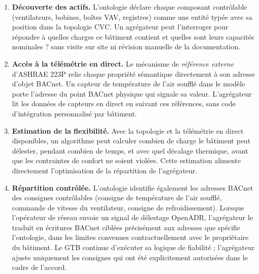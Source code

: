\begin{enumerate}[leftmargin=*, itemsep=2pt]
  \item \textbf{Découverte des actifs.} L'ontologie déclare chaque composant contrôlable (ventilateurs, bobines,
        boîtes VAV, registres) comme une entité typée avec sa position dans la topologie CVC.
        Un agrégateur peut l'interroger pour répondre à \og quelles charges ce bâtiment contient et quelles sont
        leurs capacités nominales ? \fg{} sans visite sur site ni révision manuelle de la documentation.
  \item \textbf{Accès à la télémétrie en direct.} Le mécanisme de \emph{référence externe} d'ASHRAE 223P relie
        chaque propriété sémantique directement à son adresse d'objet BACnet.
        Un capteur de température de l'air soufflé dans le modèle porte l'adresse du point BACnet physique
        qui signale sa valeur.
        L'agrégateur lit les données de capteurs en direct en suivant ces références, sans code d'intégration
        personnalisé par bâtiment.
  \item \textbf{Estimation de la flexibilité.} Avec la topologie et la télémétrie en direct disponibles, un
        algorithme peut calculer combien de charge le bâtiment peut délester, pendant combien de temps, et avec quel
        décalage thermique, avant que les contraintes de confort ne soient violées.
        Cette estimation alimente directement l'optimisation de la répartition de l'agrégateur.
  \item \textbf{Répartition contrôlée.} L'ontologie identifie également les adresses BACnet des
        consignes contrôlables (consigne de température de l'air soufflé, commande de vitesse du ventilateur, consigne de refroidissement).
        Lorsque l'opérateur de réseau envoie un signal de délestage OpenADR, l'agrégateur le traduit
        en écritures BACnet ciblées précisément aux adresses que spécifie l'ontologie, dans
        les limites convenues contractuellement avec le propriétaire du bâtiment.
        Le GTB continue d'exécuter sa logique de fiabilité ; l'agrégateur ajuste uniquement les consignes
        qui ont été explicitement autorisées dans le cadre de l'accord.
\end{enumerate}

